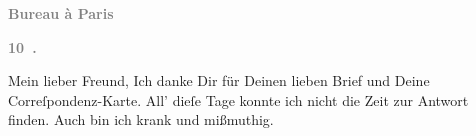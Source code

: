 \pstart
           \begin{otherlanguage}{french}\textcolor{gray}{\textbf{\textbf{Bureau à Paris}}}\end{otherlanguage}\pend
           
\pstart
           \begin{otherlanguage}{french}\textcolor{gray}{\textbf{\textbf{10 .}}}\end{otherlanguage}\pend
           
\pstart\center{}Mein lieber Freund,\pend\vspace{0.5em}
\pstart
           Ich danke Dir für Deinen lieben Brief und Deine Correſpondenz-Karte. All’ dieſe Tage
               konnte ich nicht die Zeit zur Antwort finden. Auch bin ich krank und mißmuthig.\pend
           
